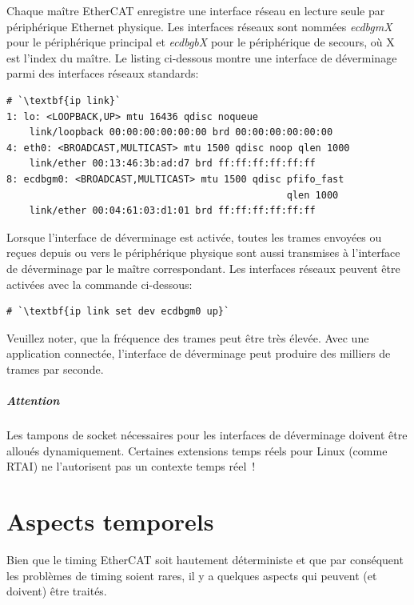 \documentclass[a4paper,12pt,BCOR=6mm,bibtotoc,idxtotoc]{scrbook}
\begin{document}
Chaque ma\^itre EtherCAT enregistre une interface r\'eseau en lecture
seule par p\'eriph\'erique Ethernet physique.  Les interfaces
r\'eseaux sont nomm\'ees \textit{ecdbgmX} pour le p\'eriph\'erique
principal et \textit{ecdbgbX} pour le p\'eriph\'erique de secours,
o\`u X est l'index du ma\^itre.  Le listing ci-dessous montre une
interface de d\'everminage parmi des interfaces r\'eseaux standards:

\begin{lstlisting}
# `\textbf{ip link}`
1: lo: <LOOPBACK,UP> mtu 16436 qdisc noqueue
    link/loopback 00:00:00:00:00:00 brd 00:00:00:00:00:00
4: eth0: <BROADCAST,MULTICAST> mtu 1500 qdisc noop qlen 1000
    link/ether 00:13:46:3b:ad:d7 brd ff:ff:ff:ff:ff:ff
8: ecdbgm0: <BROADCAST,MULTICAST> mtu 1500 qdisc pfifo_fast
                                                 qlen 1000
    link/ether 00:04:61:03:d1:01 brd ff:ff:ff:ff:ff:ff
\end{lstlisting}

Lorsque l'interface de d\'everminage est activ\'ee, toutes les trames
envoy\'ees ou re\c{c}ues depuis ou vers le p\'eriph\'erique physique
sont aussi transmises \`a l'interface de d\'everminage par le ma\^itre
correspondant. Les interfaces r\'eseaux peuvent \^etre activ\'ees avec
la commande ci-dessous:

\begin{lstlisting}
# `\textbf{ip link set dev ecdbgm0 up}`
\end{lstlisting}

Veuillez noter, que la fr\'equence des trames peut \^etre tr\`es \'elev\'ee.
Avec une application connect\'ee, l'interface de d\'everminage
peut produire des milliers de trames par seconde.

\paragraph{Attention} Les tampons de socket n\'ecessaires pour les interfaces
de d\'everminage doivent \^etre allou\'es dynamiquement.
Certaines extensions temps r\'eels pour Linux (comme RTAI)
ne l'autorisent pas un contexte temps r\'eel~!


\chapter{Aspects temporels}
\label{sec:timing}

Bien que le timing EtherCAT soit hautement d\'eterministe et que par
cons\'equent les probl\`emes de timing soient rares, il y a quelques aspects
qui peuvent (et doivent) \^etre trait\'es.
\end{document}
